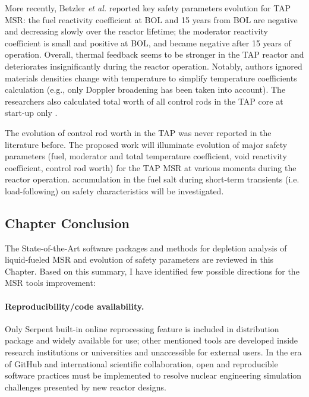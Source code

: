 More recently, Betzler \emph{et al.} reported key safety parameters evolution 
for \gls{TAP} \gls{MSR}: the fuel reactivity coefficient at \gls{BOL} and 15 
years from \gls{BOL} are negative and decreasing slowly  over the reactor 
lifetime; the moderator reactivity coefficient is small and positive at 
\gls{BOL}, and became negative after 15 years of operation. Overall, thermal 
feedback seems to be stronger in the \gls{TAP} reactor and deteriorates 
insignificantly during the reactor operation. Notably, authors ignored materials 
densities change with temperature to simplify temperature coefficients 
calculation (e.g., only  Doppler broadening has been taken into account). The 
researchers also calculated total worth of all control rods in the \gls{TAP} 
core at start-up only \cite{betzler_assessment_2017}. 

The evolution of control rod worth in the \gls{TAP} was never reported in the 
literature before. The proposed work will illuminate evolution of major safety 
parameters (fuel, moderator and total temperature coefficient, void reactivity 
coefficient, control rod worth) for the \gls{TAP} \gls{MSR} at various moments 
during the reactor operation.
accumulation in the fuel salt during short-term transients (i.e. load-following) 
on safety characteristics will be investigated.

\subsection{Chapter Conclusion}
The State-of-the-Art software packages and methods for depletion analysis of 
liquid-fueled \gls{MSR} and evolution of safety parameters are reviewed in this 
Chapter. Based on this summary, I have identified few possible directions for 
the \gls{MSR} tools improvement:
\paragraph{Reproducibility/code availability.} Only Serpent built-in online 
reprocessing feature is included in distribution package and widely available 
for use; other mentioned tools are developed inside research institutions or 
universities and unaccessible for external users. In the era of GitHub 
\cite{github_github_2015} and international scientific collaboration, open and 
reproducible software practices must be implemented to resolve nuclear 
engineering simulation challenges presented by new reactor designs.
